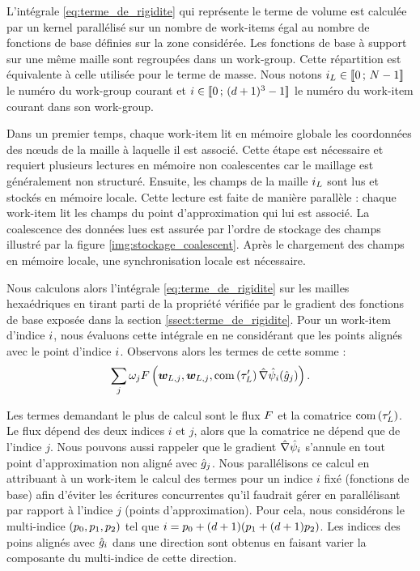 L’intégrale \eqref{eq:terme_de_rigidite} qui représente le terme de volume
est calculée par un kernel parallélisé sur un nombre de work-items égal au
nombre de fonctions de base définies sur la zone considérée.
Les fonctions de base à support sur une même maille sont regroupées dans un
work-group.
Cette répartition est équivalente à celle utilisée pour le terme de masse.
Nous notons $i_{L} \in \lbrack\!\lbrack0\,;\,N - 1\rbrack\!\rbrack$ le numéro du
work-group courant et $i \in \lbrack\!\lbrack0\,;\,(d + 1)^3 - 1\rbrack\!\rbrack$ le numéro
du work-item courant dans son work-group.


Dans un premier temps, chaque work-item lit en mémoire globale les coordonnées
des nœuds de la maille à laquelle il est associé. Cette étape est nécessaire
et requiert plusieurs lectures en mémoire non coalescentes car le maillage
est généralement non structuré. Ensuite, les champs de la maille
$i_{L}$ sont lus et stockés en mémoire locale. Cette lecture est faite de manière parallèle : chaque work-item lit les champs du point d'approximation qui lui
est associé. La coalescence des données lues est assurée par l'ordre de
stockage des champs illustré par la figure \ref{img:stockage_coalescent}.
Après le chargement des champs en mémoire locale, une synchronisation
locale est nécessaire.


Nous calculons alors l’intégrale \eqref{eq:terme_de_rigidite} sur les mailles hexaédriques
en tirant parti de la
propriété vérifiée par le gradient des fonctions de base exposée dans la section
\ref{ssect:terme_de_rigidite}. Pour un work-item d'indice
$i$, nous évaluons cette intégrale en ne considérant que les points alignés
avec le point d'indice $i$. Observons alors les termes de cette somme :
\begin{align}
	\sum_{j} \omega_{j}
		F\left(\bm{w}_{L,j},\bm{w}_{L,j},\mathrm{com}\left(\tau_{L}'\right)
		\hat{\nabla} \hat{\psi}_{i}(\hat{g}_{j})\right) .
\end{align}


Les termes demandant le plus de calcul sont le flux $F$ et la comatrice
$\mathrm{com}\left(\tau_{L}'\right)$. Le flux dépend des deux indices $i$ et $j$,
alors que la comatrice ne dépend que de l’indice $j$. Nous pouvons aussi
rappeler que le gradient $\hat{\nabla} \hat{\psi}_{i}$ s'annule en tout point
d'approximation non aligné avec $\hat{g}_{j}$.
Nous parallélisons ce calcul en attribuant à un work-item le calcul des
termes pour un indice $i$ fixé (fonctions de base) afin d'éviter les écritures concurrentes qu'il
faudrait gérer en parallélisant par rapport à l'indice $j$ (points d'approximation).
Pour cela, nous considérons le multi-indice $\left({p_{0}},{p_{1}},{p_{2}}\right)$ tel que
$i = {p_{0}} + (d + 1)({p_{1}} + (d + 1){p_{2}})$. Les indices des poins alignés avec $\hat{g}_{i}$
dans une direction sont obtenus en faisant varier la composante du multi-indice
de cette direction.

